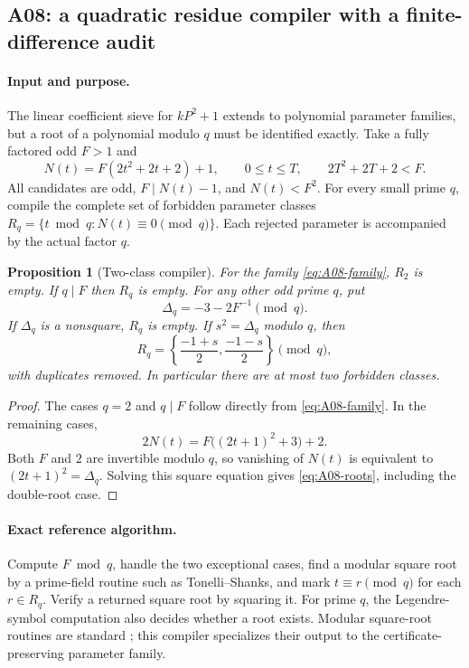 \documentclass[11pt,a4paper]{article}
\newtheorem{proposition}[theorem]{Proposition}
\theoremstyle{definition}\newtheorem{definition}[theorem]{Definition}
\theoremstyle{remark}\newtheorem{remark}[theorem]{Remark}
\begin{document}
\subsection{A08: a quadratic residue compiler with a finite-difference audit}
\label{alg:A08}

\paragraph{Input and purpose.}
The linear coefficient sieve for $kP^2+1$ extends to polynomial parameter
families, but a root of a polynomial modulo $q$ must be identified exactly.
Take a fully factored odd $F>1$ and
\begin{equation}\label{eq:A08-family}
 N(t)=F(2t^2+2t+2)+1,\qquad 0\le t\le T,
 \qquad 2T^2+2T+2<F.
\end{equation}
All candidates are odd, $F\mid N(t)-1$, and $N(t)<F^2$.
For every small prime $q$, compile the complete set of forbidden parameter
classes $R_q=\{t\bmod q:N(t)\equiv0\pmod q\}$. Each rejected parameter is
accompanied by the actual factor $q$.

\begin{proposition}[Two-class compiler]\label{prop:A08}
For the family \eqref{eq:A08-family}, $R_2$ is empty. If $q\mid F$ then
$R_q$ is empty. For any other odd prime $q$, put
\[
 \Delta_q=-3-2F^{-1}\pmod q.
\]
If $\Delta_q$ is a nonsquare, $R_q$ is empty. If $s^2=\Delta_q$ modulo $q$,
then
\begin{equation}\label{eq:A08-roots}
 R_q=\left\{\frac{-1+s}{2},\frac{-1-s}{2}\right\}\pmod q,
\end{equation}
with duplicates removed. In particular there are at most two forbidden
classes.
\end{proposition}
\begin{proof}
The cases $q=2$ and $q\mid F$ follow directly from \eqref{eq:A08-family}.
In the remaining cases,
\[
 2N(t)=F\bigl((2t+1)^2+3\bigr)+2.
\]
Both $F$ and $2$ are invertible modulo $q$, so vanishing of $N(t)$ is
equivalent to $(2t+1)^2=\Delta_q$. Solving this square equation gives
\eqref{eq:A08-roots}, including the double-root case.
\end{proof}

\paragraph{Exact reference algorithm.}
Compute $F\bmod q$, handle the two exceptional cases, find a modular square
root by a prime-field routine such as Tonelli--Shanks, and mark
$t\equiv r\pmod q$ for each $r\in R_q$. Verify a returned square root by
squaring it. For prime $q$, the Legendre-symbol computation also decides
whether a root exists. Modular square-root routines are standard
\cite{arith-flint-sqrt}; this compiler specializes their output to the
certificate-preserving parameter family.
\end{document}
